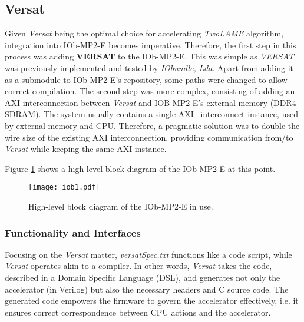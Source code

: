 
\subsection{Versat}

Given \textit{Versat} being the optimal choice for accelerating \textit{TwoLAME} algorithm, integration into IOb-MP2-E becomes imperative.
Therefore, the first step in this process was adding \textbf{VERSAT} to the IOb-MP2-E. This was simple as \textit{VERSAT} was previously implemented and tested by \textit{IObundle, Lda}. Apart from adding it as a submodule to IOb-MP2-E's repository, some paths were changed to allow correct compilation.
The second step was more complex, consisting of adding an AXI interconnection between \textit{Versat} and IOB-MP2-E's external memory (DDR4 SDRAM). The system usually contains a single AXI~\cite{bib:axi_xilinx} interconnect instance, used by external memory and CPU. Therefore, a pragmatic solution was to double the wire size of the existing AXI interconnection, providing communication from/to \textit{Versat} while keeping the same AXI instance.

Figure \ref{fig:newiob2} shows a high-level block diagram of the IOb-MP2-E at this point.

\vspace{0.1cm}

\begin{figure}[H]
\centerline{\texttt{[image: iob1.pdf]}}
\caption{High-level block diagram of the IOb-MP2-E in use.}
\label{fig:newiob2}
\end{figure}

\subsubsection{Functionality and Interfaces}

Focusing on the \textit{Versat} matter, \textit{versatSpec.txt} functions like a code script, while \textit{Versat} operates akin to a compiler. In other words, \textit{Versat} takes the code, described in a Domain Specific Language (DSL), and generates not only the accelerator (in Verilog) but also the necessary headers and C source code. The generated code empowers the firmware to govern the accelerator effectively, i.e. it ensures correct correspondence between CPU actions and the accelerator.


